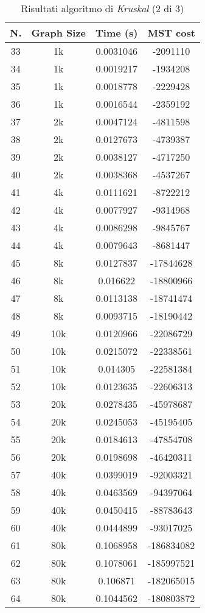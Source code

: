 \begin{table}[H]
	\centering
	\begin{tabular}{|c|c|c|c|}
		\hline
		\textbf{N.} & \textbf{Graph Size} & \textbf{Time (s)} & \textbf{MST	cost}\\
		\hline
		33 & 1k & 0.0031046 & -2091110\\
		\hline
		34 & 1k & 0.0019217 & -1934208\\
		\hline
		35 & 1k & 0.0018778 & -2229428\\
		\hline
		36 & 1k & 0.0016544 & -2359192\\
		\hline\hline
		37 & 2k & 0.0047124 & -4811598\\
		\hline
		38 & 2k & 0.0127673 & -4739387\\
		\hline
		39 & 2k & 0.0038127 & -4717250\\
		\hline
		40 & 2k & 0.0038368 & -4537267\\
		\hline\hline
		41 & 4k & 0.0111621 & -8722212\\
		\hline
		42 & 4k & 0.0077927 & -9314968\\
		\hline
		43 & 4k & 0.0086298 & -9845767\\
		\hline
		44 & 4k & 0.0079643 & -8681447\\
		\hline\hline
		45 & 8k & 0.0127837 & -17844628\\
		\hline
		46 & 8k & 0.016622 & -18800966\\
		\hline
		47 & 8k & 0.0113138 & -18741474\\
		\hline
		48 & 8k & 0.0093715 & -18190442\\
		\hline\hline
		49 & 10k & 0.0120966 & -22086729\\
		\hline
		50 & 10k & 0.0215072 & -22338561\\
		\hline
		51 & 10k & 0.014305 & -22581384\\
		\hline
		52 & 10k & 0.0123635 & -22606313\\
		\hline\hline
		53 & 20k & 0.0278435 & -45978687\\
		\hline
		54 & 20k & 0.0245053 & -45195405\\
		\hline
		55 & 20k & 0.0184613 & -47854708\\
		\hline
		56 & 20k & 0.0198698 & -46420311\\
		\hline\hline
		57 & 40k & 0.0399019 & -92003321\\
		\hline
		58 & 40k & 0.0463569 & -94397064\\
		\hline
		59 & 40k & 0.0450415 & -88783643\\
		\hline
		60 & 40k & 0.0444899 & -93017025\\
		\hline\hline
		61 & 80k & 0.1068958 & -186834082\\
		\hline
		62 & 80k & 0.1078061 & -185997521\\
		\hline
		63 & 80k & 0.106871 & -182065015\\
		\hline
		64 & 80k & 0.1044562 & -180803872\\
		\hline
	\end{tabular}
	\caption{Risultati algoritmo di \textit{Kruskal} (2 di 3)}
\end{table}

